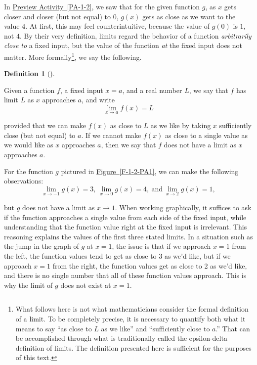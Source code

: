 \documentclass[10pt,]{book}
\theoremstyle{plain}
\theoremstyle{definition}
\newtheorem{definition}[theorem]{Definition}
\theoremstyle{definition}
\theoremstyle{definition}
\theoremstyle{definition}
\theoremstyle{definition}
\numberwithin{equation}{section}
\begin{document}
In \hyperref[PA-1-2]{Preview Activity~\ref{PA-1-2}}, we saw that for the given function \(g\), as \(x\) gets closer and closer (but not equal) to 0, \(g(x)\) gets as close as we want to the value 4. At first, this may feel counterintuitive, because the value of \(g(0)\) is \(1\), not \(4\). By their very definition, limits regard the behavior of a function \emph{arbitrarily close to} a fixed input, but the value of the function \emph{at} the fixed input does not matter. More formally\footnote{What follows here is not what mathematicians consider the formal definition of a limit.  To be completely precise, it is necessary to quantify both what it means to say ``as close to \(L\) as we like'' and ``sufficiently close to \(a\).''  That can be accomplished through what is traditionally called the epsilon-delta definition of limits.  The definition presented here is sufficient for the purposes of this text.\label{fn-1}}, we say the following.
%
\begin{definition}[{}]\label{definition-1}

    Given a function \(f\), a fixed input \(x = a\), and a real number \(L\), we say that \(f\) has limit \index{} \(L\) as \(x\) approaches \(a\), and write
\begin{equation*}
    \lim_{x \to a} f(x) = L
    \end{equation*}\par

    provided that we can make \(f(x)\) as close to \(L\) as we like by taking \(x\) sufficiently close (but not equal) to \(a\). If we cannot make \(f(x)\) as close to a single value as we would like as \(x\) approaches \(a\), then we say that \(f\) does not have a limit as \(x\) approaches \(a\).
\end{definition}
\par

For the function \(g\) pictured in \hyperref[F-1-2-PA1]{Figure~\ref{F-1-2-PA1}}, we can make the following observations:
%
\begin{equation*}
 \lim_{x \to -1} g(x) = 3, \  \lim_{x \to 0} g(x) = 4, \ \mbox{and}  \  \lim_{x \to 2} g(x) = 1,
\end{equation*}\par

but \(g\) does not have a limit as \(x \to 1\). When working graphically, it suffices to ask if the function approaches a single value from each side of the fixed input, while understanding that the function value right at the fixed input is irrelevant. This reasoning explains the values of the first three stated limits. In a situation such as the jump in the graph of \(g\) at \(x = 1\), the issue is that if we approach \(x = 1\) from the left, the function values tend to get as close to 3 as we'd like, but if we approach \(x = 1\) from the right, the function values get as close to 2 as we'd like, and there is no single number that all of these function values approach. This is why the limit of \(g\) does not exist at \(x = 1\).
%
\par
\end{document}
